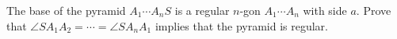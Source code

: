 The base of the pyramid $A_1 \cdots A_nS$ is a regular $n$-gon $A_1 \cdots A_n$ with side $a$. Prove that $\angle SA_1A_2 = \cdots = \angle SA_nA_1$ implies that the pyramid is regular.
